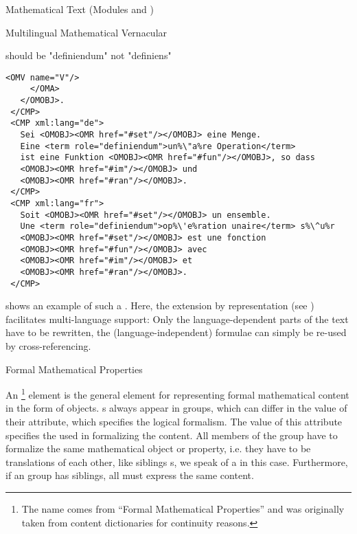 \begin{tchapter}[id=mtxt,short=Mathematical Text]{Mathematical Text (Modules
  {} and {})}
\begin{tsection}[id=mtext]{Multilingual Mathematical Vernacular}
\begin{erratum}[reported-by=Krzysztof Retel,date=2006-09-14]{should be "definiendum" not "definiens"}
\begin{lstlisting}[escapechar=\%,label=lst:multiling,mathescape,
  caption={A Multilingual Group of {\element{CMP}} Elements},
  index={trl,xml:lang,CMP,FMP,OMOBJ}]
       <OMV name="V"/>
     </OMA>
   </OMOBJ>.
 </CMP>
 <CMP xml:lang="de">
   Sei <OMOBJ><OMR href="#set"/></OMOBJ> eine Menge. 
   Eine <term role="definiendum">un%\"a%re Operation</term> 
   ist eine Funktion <OMOBJ><OMR href="#fun"/></OMOBJ>, so dass
   <OMOBJ><OMR href="#im"/></OMOBJ> und 
   <OMOBJ><OMR href="#ran"/></OMOBJ>.
 </CMP>
 <CMP xml:lang="fr">
   Soit <OMOBJ><OMR href="#set"/></OMOBJ> un ensemble. 
   Une <term role="definiendum">op%\'e%ration unaire</term> s%\^u%r
   <OMOBJ><OMR href="#set"/></OMOBJ> est une fonction 
   <OMOBJ><OMR href="#fun"/></OMOBJ> avec 
   <OMOBJ><OMR href="#im"/></OMOBJ> et 
   <OMOBJ><OMR href="#ran"/></OMOBJ>.
 </CMP>
\end{lstlisting}
\end{erratum}

{} shows an example of such a {}. Here,
the {\openmath} extension by {}
representation (see {}) facilitates multi-language support: Only the
language-dependent parts of the text have to be rewritten, the (language-independent)
formulae can simply be re-used by cross-referencing.
\end{tsection}

\begin{tsection}[id=FMP]{Formal Mathematical Properties}
  
  An {}\footnote{The name comes from ``Formal Mathematical Properties'' and was
    originally taken from {\openmath} content dictionaries for continuity reasons.}
  element is the general element for representing formal mathematical content in the form
  of {\openmath} objects. {}s always appear in groups, which can differ in
  the value of their {} attribute, which specifies the logical
  formalism. The value of this attribute specifies the {} used in
  formalizing the content.  All members of the group have to formalize the same
  mathematical object or property, i.e. they have to be translations of each other, like
  siblings {}s, we speak of a {} in this case. Furthermore, if an {}
  group has {} siblings, all must express the same content.


\end{tsection}
\end{tchapter}
